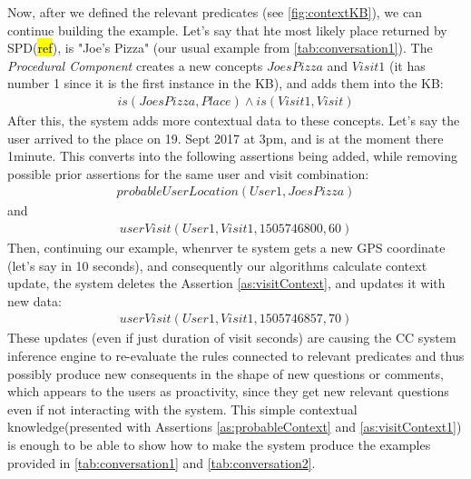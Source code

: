 Now, after we defined the relevant predicates (see \autoref{fig:contextKB}), we 
can continue building the example.
Let's say that hte most likely place returned by SPD(\hl{ref}), is "Joe's Pizza"
(our usual example from \autoref{tab:conversation1}). The 
\emph{Procedural Component} creates a new concepts  $JoesPizza$ and 
$Visit1$ (it has number 1 since it is the first instance in the KB), and adds 
them into the KB:
\begin{equation}\label{as:joesPizzaVisit}
\begin{gathered}
	is(JoesPizza,Place) \land is(Visit1,Visit)
\end{gathered}
\end{equation}
After this, the system adds more contextual data to these concepts. Let's say
the user arrived to the place on 19. Sept 2017 at 3pm, and is at the moment
there 1minute. This converts into the following assertions being added, while
removing possible prior assertions for the same user and visit combination:
\begin{equation}\label{as:probableContext}
\begin{gathered}
	probableUserLocation(User1,JoesPizza)
\end{gathered}
\end{equation}
and
\begin{equation}\label{as:visitContext}
\begin{gathered}
	userVisit(User1,Visit1,1505746800,60)
\end{gathered}
\end{equation}
Then, continuing our example, whenrver te system gets a new GPS coordinate
(let's say in 10 seconds), and consequently our algorithms calculate context 
update, the system deletes the Assertion \ref{as:visitContext}, and updates it
with new data:
\begin{equation}\label{as:visitContext1}
\begin{gathered}
	userVisit(User1,Visit1,1505746857,70)
\end{gathered}
\end{equation}
These updates (even if just duration of visit seconds) are causing the CC 
system inference engine to re-evaluate the rules connected to relevant 
predicates and thus possibly produce new consequents in the shape of new 
questions or comments, which appears to the users as proactivity, since they 
get new relevant questions even if not interacting with the system.
This simple contextual knowledge(presented with Assertions 
\ref{as:probableContext} and \ref{as:visitContext1}) is enough to be able to 
show how to make the system produce the examples provided in 
\autoref{tab:conversation1} and \autoref{tab:conversation2}.

